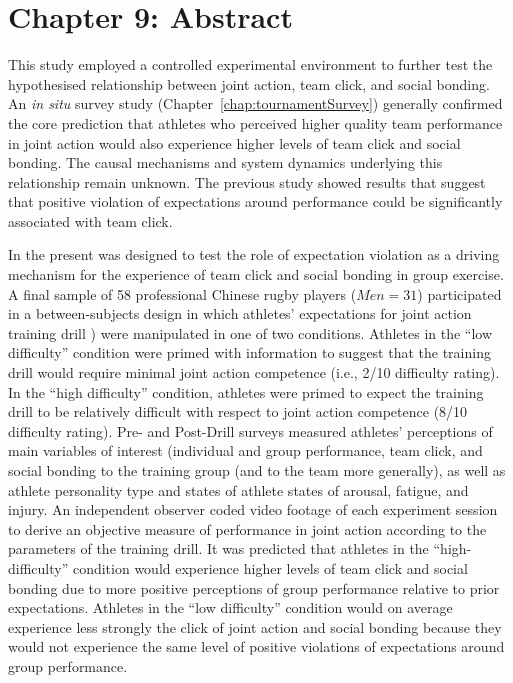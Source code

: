 \chapter*{Chapter 9: Abstract}



This study employed a controlled experimental environment to further test the hypothesised relationship between joint action, team click, and social bonding. An \textit{in situ} survey study (Chapter~\ref{chap:tournamentSurvey}) generally confirmed the core prediction that athletes who perceived higher quality team performance in joint action would also experience higher levels of team click and social bonding. The causal mechanisms and system dynamics underlying this relationship remain unknown.  The previous study showed results that suggest that positive violation of expectations around performance could be significantly associated with team click.

In the present was designed to test the role of expectation violation as a driving mechanism for the experience of team click and social bonding in group exercise. A final sample of 58 professional Chinese rugby players ($Men = 31$) participated in a between-subjects design in which athletes' expectations for joint action training drill \citep[``Invasion drill''][]{Passos2011}) were manipulated in one of two conditions.  Athletes in the ``low difficulty'' condition were primed with information to suggest that the training drill would require minimal joint action competence (i.e., 2/10 difficulty rating).  In the ``high difficulty'' condition, athletes were primed to expect the training drill to be relatively difficult with respect to joint action competence (8/10 difficulty rating).  Pre- and Post-Drill surveys measured athletes' perceptions of main variables of interest (individual and group performance, team click, and social bonding to the training group (and to the team more generally), as well as athlete personality type and states of athlete states of arousal, fatigue, and injury.  An independent observer coded video footage of each experiment session to derive an objective measure of performance in joint action according to the parameters of the training drill.  It was predicted that athletes in the ``high-difficulty'' condition would experience higher levels of team click and social bonding due to more positive perceptions of group performance relative to prior expectations.  Athletes in the ``low difficulty'' condition would on average experience less strongly the click of joint action and social bonding because they would not experience the same level of positive violations of expectations around group performance.

